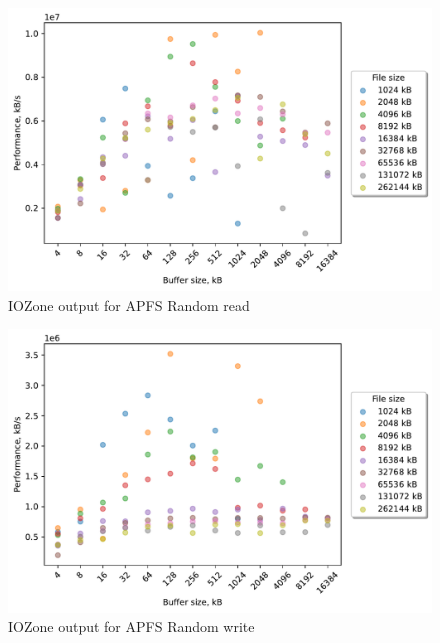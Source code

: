 \begin{figure}[!htb]
	\label{fig:bench_apfs_rnd_read}
	\begin{center}
		\includegraphics[width=1.0\textwidth]{figures/benchmarking/local/Random read.pdf}
	\end{center}
	\caption{IOZone output for \gls{APFS} Random read}
\end{figure}

\begin{figure}[!htb]
	\label{fig:bench_apfs_rnd_write}
	\begin{center}
		\includegraphics[width=1.0\textwidth]{figures/benchmarking/local/Random write.pdf}
	\end{center}
	\caption{IOZone output for \gls{APFS} Random write}
\end{figure}